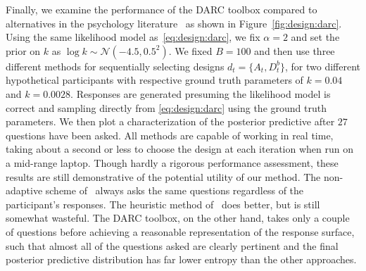 Finally, we examine the performance of the DARC toolbox compared to alternatives in the
psychology literature~\citep{Kirby:2009eu,Frye:2016eu} as shown in Figure~\ref{fig:design:darc}.  Using the
same likelihood model as~\eqref{eq:design:darc},
we fix $\alpha=2$ and set the prior on $k$ as $\log k \sim \mathcal{N}(-4.5,0.5^2)$.  We fixed $B=100$ and
then use three different methods for sequentially selecting designs $d_t = \{A_t,D^b_t\}$, for
two different hypothetical participants with respective ground truth parameters of $k=0.04$ and $k=0.0028$.
Responses are generated presuming the likelihood model is correct and sampling directly from
\eqref{eq:design:darc} using the ground truth parameters.  We then plot a characterization of the posterior
predictive after $27$ questions have been asked.  All methods are capable of working in real time, taking
about a second or less to choose the design at each iteration when run on a mid-range laptop.  Though 
hardly a rigorous performance assessment, these results are still demonstrative of the potential utility of our
method.  The non-adaptive scheme of~\cite{Kirby:2009eu} always asks the same questions regardless of
the participant's responses.  The heuristic method of~\cite{Frye:2016eu} does better, but is still somewhat
wasteful.  The DARC toolbox, on the other hand, takes only a couple of questions before achieving a
reasonable representation of the response surface, such that almost all of the questions asked are clearly
pertinent and the final posterior predictive distribution has far lower entropy than the other approaches.